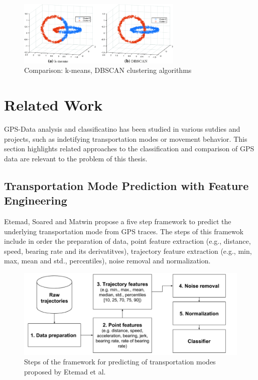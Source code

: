 \documentclass[a4paper,12pt,twoside]{scrreprt}
\begin{document}
\begin{figure}[htbp]
  \centering

  \includegraphics[width=0.7\textwidth]{Figures/background/k-means-and-DBSCAN-clustering-results-on-Chainlink-data-set.png}
  \caption{Comparison: k-means, DBSCAN clustering algorithms
    \cite{liang_graph-based_2024}}
  \label{fig:dbscan_against_k-means}
\end{figure}
\FloatBarrier

\section{Related Work}
GPS-Data analysis and classificatino has been studied in various sutdies and
projects, such as indetifying transportation modes or movement behavior.
This section highlights related approaches to the classification and comparison
of
GPS data are relevant to the problem of this thesis.

\subsection{Transportation Mode Prediction with Feature Engineering}
Etemad, Soared and Matwin \cite{etemad_predicting_2018} propose a five step
framework to predict the
underlying transportation mode from GPS traces. The steps of this framewok
include in order the preparation of data, point feature extraction (e.g.,
distance, speed, bearing rate and its derivatitves), trajectory feature
extraction (e.g., min, max, mean and std., percentiles), noise removal and
normalization.

\begin{figure}[htbp]
  \centering
  \includegraphics[width=\textwidth]{Figures/related_work/etemad_pipeline.png}
  \caption{Steps of the framework for predicting of transportation
    modes proposed by Etemad et al.~\cite{etemad_predicting_2018}}
  \label{fig:etemad_framework_prediction}
\end{figure}
\FloatBarrier
\end{document}
